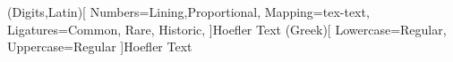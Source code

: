 
\usepackage{acronym} %
\renewcommand*{\aclabelfont}[1]{\acsfont{#1}}



\usepackage[quiet]{mathspec}
\usepackage{xltxtra} %
\setmathfont(Digits,Latin)[
  Numbers={Lining,Proportional},
  Mapping=tex-text,
  Ligatures={Common, Rare, Historic},
]{Hoefler Text}
\setmathfont(Greek)[
  Lowercase=Regular,
  Uppercase=Regular
]{Hoefler Text}
\setmainfont[
Mapping=tex-text,
Ligatures={TeX, Common, Rare, Historic},
]{Hoefler Text}

